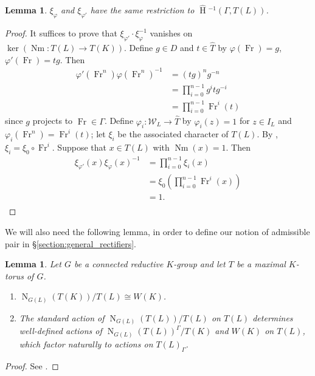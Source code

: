\documentclass[11pt]{amsart}
\theoremstyle{plain}
\newtheorem{lemma}[theorem]{Lemma}
\newcommand{\HT}[1]{\hat{\HH}{}^{#1}}
\theoremstyle{definition}
\DeclareMathOperator{\HH}{H}
\DeclareMathOperator{\Nm}{Nm}
\DeclareMathOperator{\Fr}{Fr}
\newcommand{\Weil}{\mathcal{W}}
\newcommand{\Normalizer}[2]{\operatorname{N}_{#2}(#1)}
\begin{document}
\begin{lemma} \label{lem:toral_modification}
$\xi_{\varphi}$ and $\xi_{\varphi'}$ have the same restriction to $\HT{-1}(\Gamma, T(L))$.
\end{lemma}

\begin{proof}
It suffices to prove that $\xi_{\varphi'} \cdot \xi_{\varphi}^{-1}$ vanishes on
$\ker(\Nm : T(L) \rightarrow T(K))$.  Define $g \in D$ and $t \in \hat{T}$ by
$\varphi(\Fr) = g$, $\varphi'(\Fr) = tg$.  Then
\begin{align*}
\varphi'(\Fr^n) \varphi(\Fr^n)^{-1} &= (tg)^n g^{-n} \\
&= \prod_{i=0}^{n-1} g^i t g^{-i} \\
&= \prod_{i=0}^{n-1} \Fr^i(t)
\end{align*}
since $g$ projects to $\Fr \in \Gamma$.  Define $\varphi_i \colon \Weil_L \rightarrow \hat{T}$
by $\varphi_i(z) = 1$ for $z \in I_L$ and
$\varphi_i(\Fr^n) = \Fr^i(t)$; let $\xi_i$ be the associated character
of $T(L)$.  By \cite[Lem. 4.3.1]{reeder-debacker:09a}, $\xi_i = \xi_0 \circ \Fr^i.$
Suppose that $x \in T(L)$ with $\Nm(x) = 1$.  Then
\begin{align*}
\xi_{\varphi'}(x) \xi_{\varphi}(x)^{-1} &= \prod_{i=0}^{n-1} \xi_i(x) \\
&= \xi_0 \left(\prod_{i=0}^{n-1}\Fr^i(x)\right) \\
&= 1.\\
\end{align*}
\end{proof}

We will also need the following lemma, in order to define our notion of admissible pair
in \S\ref{section:general_rectifiers}.

\begin{lemma} \label{lem:weyl_groups}
Let $G$ be a connected reductive $K$-group and let $T$ be a maximal
$K$-torus of $G$.
\begin{enumerate}
\item $\Normalizer{T(K)}{G(L)} / T(L) \cong W(K)$.
\item The standard action of $\Normalizer{T(L)}{G(L)} / T(L)$ on $T(L)$ determines
well-defined actions of $\Normalizer{T(L)}{G(L)}^\Gamma / T(K)$ and $W(K)$
on $T(L)$, which factor naturally to actions on $T(L)_\Gamma$.
\end{enumerate}
\end{lemma}

\begin{proof}
See \cite[Lem. 9.1]{adrian-lansky:ppa}.
\end{proof}
\end{document}
